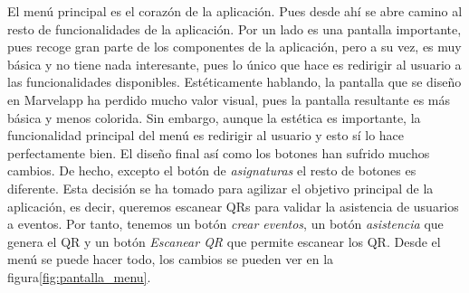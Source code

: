 El menú principal es el corazón de la aplicación. Pues desde ahí se abre camino al resto de funcionalidades de la aplicación. Por un lado es una pantalla importante, pues recoge gran parte de los componentes de la aplicación, pero a su vez, es muy básica y no tiene nada interesante, pues lo único que hace es redirigir al usuario a las funcionalidades disponibles. Estéticamente hablando, la pantalla que se diseño en Marvelapp ha perdido mucho valor visual, pues la pantalla resultante es más básica y menos colorida. Sin embargo, aunque la estética es importante, la funcionalidad principal del menú es redirigir al usuario y esto sí lo hace perfectamente bien. El diseño final así como los botones han sufrido muchos cambios. De hecho, excepto el botón de \emph{asignaturas} el resto de botones es diferente. Esta decisión se ha tomado para agilizar el objetivo principal de la aplicación, es decir, queremos escanear QRs para validar la asistencia de usuarios a eventos. Por tanto, tenemos un botón \emph{crear eventos}, un botón \emph{asistencia} que genera el QR y un botón \emph{Escanear QR} que permite escanear los QR. Desde el menú se puede hacer todo, los cambios se pueden ver en la figura\ref{fig:pantalla_menu}. \\

